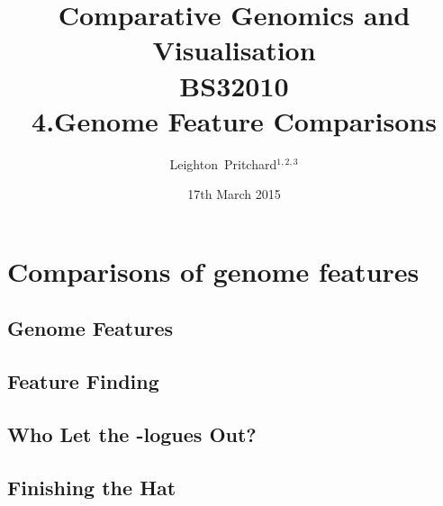 

%



\title[Comparative Genomics and Visualisation: 4.Genome Features] %
{Comparative Genomics and \\ Visualisation \\
BS32010 \\
4.Genome Feature Comparisons}
\author[Pritchard] %
{Leighton~Pritchard$^{1,2,3}$}
\date[17th March 2015] %
{17th March 2015}
\subject{Bioinformatics, Genomics, Bacteria, Sequencing, Microbiology, Microbes, Comparative Genomics, Visualisation}





\frame[plain]{\titlepage}



\section{Comparisons of genome features}
\subsection{Genome Features}

\subsection{Feature Finding}

\subsection{Who Let the -logues Out?}
\subsection{Finishing the Hat}



